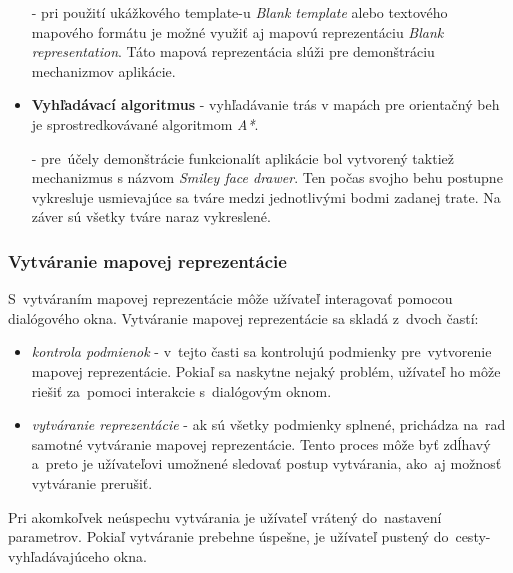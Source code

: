 \documentclass[12pt,a4paper]{report}
\begin{document}
\begin{itemize}
    - pri použití ukážkového template-u \textit{Blank template} alebo textového mapového formátu je možné využiť aj mapovú reprezentáciu \textit{Blank representation}. Táto mapová reprezentácia slúži pre demonštráciu mechanizmov aplikácie.   
    \item \textbf{Vyhľadávací algoritmus} - vyhľadávanie trás v mapách pre orientačný beh je sprostredkovávané algoritmom \textit{A*}.
    
    - pre~účely demonštrácie funkcionalít aplikácie bol vytvorený taktiež mechanizmus s názvom \textit{Smiley face drawer}. Ten počas svojho behu postupne vykresluje usmievajúce sa tváre medzi jednotlivými bodmi zadanej trate. Na záver sú všetky tváre naraz vykreslené.
\end{itemize}

\subsubsection{Vytváranie mapovej reprezentácie}

\begin{figure}[h]\centering
{}
\end{figure}

S~vytváraním mapovej reprezentácie môže užívateľ interagovať pomocou dialógového okna. Vytváranie mapovej reprezentácie sa skladá z~dvoch častí:
\begin{itemize}
    \item \textit{kontrola podmienok} - v~tejto časti sa kontrolujú podmienky pre~vytvorenie mapovej reprezentácie. Pokiaľ sa naskytne nejaký problém, užívateľ ho môže riešiť za~pomoci interakcie s~dialógovým oknom.
    \item \textit{vytváranie reprezentácie} - ak sú všetky podmienky splnené, prichádza na~rad samotné vytváranie mapovej reprezentácie. Tento proces môže byť zdĺhavý a~preto je užívateľovi umožnené sledovať postup vytvárania, ako~aj možnosť vytváranie prerušiť.
\end{itemize}

Pri akomkoľvek neúspechu vytvárania je užívateľ vrátený do~nastavení parametrov. Pokiaľ vytváranie prebehne úspešne, je užívateľ pustený do~cesty-vyhľadávajúceho okna.
\end{document}
